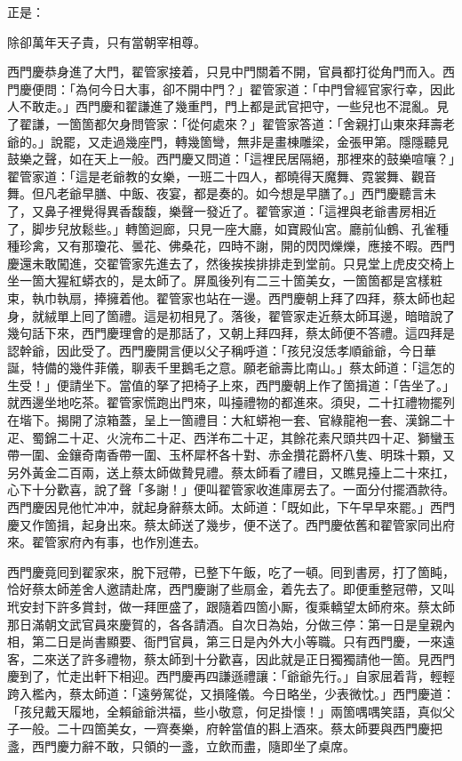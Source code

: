 正是：

\begin{myquote}
除卻萬年天子貴，只有當朝宰相尊。
\end{myquote}

西門慶恭身進了大門，翟管家接着，只見中門關着不開，{}官員都打從角門而入。西門慶便問：「為何今日大事，卻不開中門？」翟管家道：「中門曾經官家行幸，因此人不敢走。」西門慶和翟謙進了幾重門，門上都是武官把守，一些兒也不混亂。見了翟謙，一箇箇都欠身問管家：「從何處來？」翟管家答道：「舍親打山東來拜壽老爺的。」說罷，又走過幾座門，轉幾箇彎，無非是畫棟雕梁，金張甲第。隱隱聽見鼓樂之聲，如在天上一般。西門慶又問道：「這裡民居隔絕，那裡來的鼓樂喧嚷？」翟管家道：「這是老爺教的女樂，一班二十四人，都曉得天魔舞、霓裳舞、觀音舞。但凡老爺早膳、中飯、夜宴，都是奏的。如今想是早膳了。」{}西門慶聽言未了，又鼻子裡覺得異香馥馥，樂聲一發近了。翟管家道：「這裡與老爺書房相近了，脚步兒放鬆些。」轉箇迴廊，只見一座大廳，如寶殿仙宮。廳前仙鶴、孔雀種種珍禽，又有那瓊花、曇花、佛桑花，四時不謝，開的閃閃爍爍，應接不暇。西門慶還未敢闖進，交翟管家先進去了，然後挨挨排排走到堂前。只見堂上虎皮交椅上坐一箇大猩紅蟒衣的，是太師了。屏風後列有二三十箇美女，一箇箇都是宮樣粧束，執巾執扇，捧擁着他。翟管家也站在一邊。西門慶朝上拜了四拜，蔡太師也起身，就絨單上囘了箇禮。這是初相見了。落後，翟管家走近蔡太師耳邊，暗暗說了幾句話下來，西門慶理會的是那話了，又朝上拜四拜，蔡太師便不答禮。這四拜是認幹爺，因此受了。{}西門慶開言便以父子稱呼道：「孩兒沒恁孝順爺爺，今日華誕，特備的幾件菲儀，聊表千里鵝毛之意。願老爺壽比南山。」蔡太師道：「這怎的生受！」便請坐下。當值的拏了把椅子上來，西門慶朝上作了箇揖道：「告坐了。」就西邊坐地吃茶。翟管家慌跑出門來，叫擡禮物的都進來。須臾，二十扛禮物擺列在堦下。揭開了涼箱蓋，呈上一箇禮目：大紅蟒袍一套、官綠龍袍一套、漢錦二十疋、蜀錦二十疋、火浣布二十疋、西洋布二十疋，其餘花素尺頭共四十疋、獅蠻玉帶一圍、金鑲奇南香帶一圍、玉杯犀杯各十對、赤金攢花爵杯八隻、明珠十顆，又另外黃金二百兩，送上蔡太師做贄見禮。蔡太師看了禮目，又瞧見擡上二十來扛，心下十分歡喜，說了聲「多謝！」便叫翟管家收進庫房去了。一面分付擺酒款待。西門慶因見他忙冲冲，就起身辭蔡太師。太師道：「既如此，下午早早來罷。」西門慶又作箇揖，起身出來。蔡太師送了幾步，便不送了。{}西門慶依舊和翟管家同出府來。翟管家府內有事，也作別進去。

西門慶竟囘到翟家來，脫下冠帶，已整下午飯，吃了一頓。囘到書房，打了箇盹，恰好蔡太師差舍人邀請赴席，西門慶謝了些扇金，着先去了。即便重整冠帶，又叫玳安封下許多賞封，做一拜匣盛了，跟隨着四箇小厮，復乘轎望太師府來。蔡太師那日滿朝文武官員來慶賀的，各各請酒。自次日為始，分做三停：第一日是皇親內相，第二日是尚書顯要、衙門官員，第三日是內外大小等職。只有西門慶，一來遠客，二來送了許多禮物，蔡太師到十分歡喜，因此就是正日獨獨請他一箇。見西門慶到了，忙走出軒下相迎。西門慶再四謙遜禮讓：「爺爺先行。」自家屈着背，輕輕跨入檻內，蔡太師道：「遠勞駕從，又損隆儀。今日略坐，少表微忱。」西門慶道：「孩兒戴天履地，全賴爺爺洪福，些小敬意，何足掛懷！」兩箇喁喁笑語，真似父子一般。{}二十四箇美女，一齊奏樂，府幹當值的斟上酒來。蔡太師要與西門慶把盞，西門慶力辭不敢，只領的一盞，立飲而盡，隨即坐了桌席。

